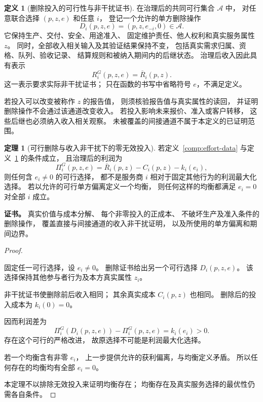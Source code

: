 \documentclass[UTF8,12pt,a4paper,openany,fontset=none,zihao=false]{ctexrep}
\theoremstyle{definition}
\newtheorem{definition}{定义}[chapter]
\newtheorem{theorem}{定理}[chapter]
\newenvironment{certificate}{\par\noindent\textbf{证书。}\ignorespaces}{\par}
\newcommand{\1}{\mathbf 1}
\begin{document}
\begin{definition}[删除投入的可行性与非干扰证书]
\label{comp:deletion}
在治理后的共同可行集合 \(\mathcal A\) 中，
对任意联合选择 \((p,z,e)\) 和任意 \(i\)，
登记一个允许的单方删除操作
\[
 D_i(p,z,e)=(p,z,e_{-i},0)\in\mathcal A.
\]
它保持生产、交付、安全、用途准入、
固定维护责任、他人权利和真实服务属性 \(z\)。
同时，全部收入相关输入及其验证结果保持不变，
包括真实需求归属、资格、队列、验收记录、
结算规则和被纳入期间内的后继状态。
治理后收入因此具有表示
\[
 R_i^G(p,z,e)=\overline R_i(p,z).
\]
这一表示要求实际非干扰证书；
只在函数的书写中省略符号 \(e\)，不满足定义。
\end{definition}

若投入可以改变被称作 \(z\) 的报告值，
则须核验报告值与真实属性的读回，
并证明删除操作不会通过该通道改变收入。
若投入影响未来报价、准入或客户转移，
这些后继也必须纳入收入相关观察。
未被覆盖的间接通道不属于本定义的已证明范围。

\begin{theorem}[可行删除与收入非干扰下的零无效投入]
\label{comp:zero-effort}
若定义~\ref{comp:effort-data}
与定义~\ref{comp:deletion} 的条件成立，
且治理后的利润为
\[
 \Pi_i^G(p,z,e)
 =\overline R_i(p,z)-C_i(p,z)-k_i(e_i),
\]
则任何含 \(e_i\ne0\) 的可行选择，
都不是服务商 \(i\) 相对于固定其他行为的利润最大化选择。
若以允许的可行单方偏离定义一个均衡，
则任何这样的均衡都满足 \(e_i=0\) 对全部 \(i\) 成立。
\end{theorem}
\begin{certificate}
真实价值与成本分解、
每个非零投入的正成本、
不破坏生产及准入条件的删除操作，
覆盖直接与间接通道的收入非干扰证明，
以及所使用的单方偏离和期间边界。
\end{certificate}
\begin{proof}
\begin{semanticsteps}
\item 固定任一可行选择，设 \(e_i\ne0\)。
删除证书给出另一个可行选择 \(D_i(p,z,e)\)。
该选择保持其他参与者行为及本方真实属性 \(z_i\)。
\item 非干扰证书使删除前后收入相同；
其余真实成本 \(C_i(p,z)\) 也相同。
删除后的投入成本为 \(k_i(0)=0\)。
\item 因而利润差为
\[
 \Pi_i^G(D_i(p,z,e))-\Pi_i^G(p,z,e)
 =k_i(e_i)>0.
\]
存在这个可行的严格改进，
故原选择不可能是利润最大化选择。
\item 若一个均衡含有非零 \(e_i\)，
上一步提供允许的获利偏离，与均衡定义矛盾。
所以任何存在的均衡均有全部 \(e_i=0\)。
\end{semanticsteps}
本定理不以排除无效投入来证明均衡存在；
均衡存在及真实服务选择的最优性仍需各自条件。
\end{proof}
\end{document}
